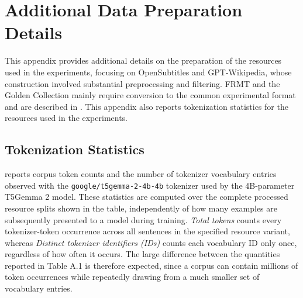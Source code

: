 \chapter{Additional Data Preparation Details}
\label{chap:appendix-data-details}
\label{chap:appendix-opensubs-filtering}

This appendix provides additional details on the preparation of the resources
used in the experiments, focusing on OpenSubtitles and GPT-Wikipedia, whose
construction involved substantial preprocessing and filtering. FRMT and the Golden Collection mainly require conversion to the
common experimental format and are described in
. This appendix
also reports tokenization statistics for the resources used in the experiments.

\section{Tokenization Statistics}
\label{sec:appendix-tokenization-statistics}

 reports corpus token counts and the
number of tokenizer vocabulary entries observed with the
\texttt{google/t5gemma-2-4b-4b} tokenizer used by the 4B-parameter T5Gemma 2
model.
These statistics are computed over the complete processed resource splits shown
in the table, independently of how many examples are subsequently presented to
a model during training.
\textit{Total tokens} counts every tokenizer-token occurrence across all
sentences in the specified resource variant, whereas \textit{Distinct
tokenizer identifiers (IDs)} counts each vocabulary ID only once, regardless of how often it
occurs. The large difference between the quantities reported in Table A.1 is
therefore expected, since a corpus can contain millions of token occurrences
while repeatedly drawing from a much smaller set of vocabulary entries.

